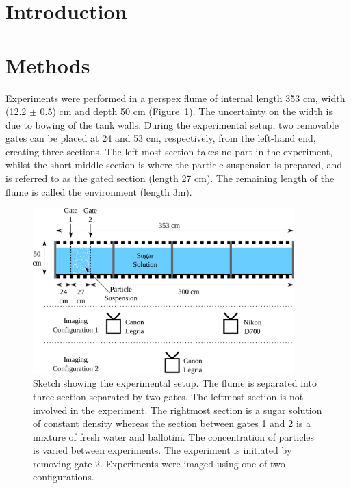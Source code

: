 \documentclass[authoryear,preprint,review,12pt]{elsarticle}
\begin{document}
\begin{frontmatter}
\begin{keyword}



\end{keyword}

\end{frontmatter}


\section{Introduction}
\label{sec:intro}

\section{Methods}
\label{sec:method}

Experiments were performed in a perspex flume of internal length 353 cm, width (12.2 $\pm$ 0.5) cm and depth 50 cm (Figure~\ref{fig:setup}). The uncertainty on the width is due to bowing of the tank walls. During the experimental setup, two removable gates can be placed at 24 and 53 cm, respectively, from the left-hand end, creating three sections. The left-most section takes no part in the experiment, whilst the short middle section is where the particle suspension is prepared, and is referred to as the gated section (length 27 cm). The remaining length of the flume is called the environment (length 3m).

\begin{figure}[ht!]
  \centerline{\includegraphics[width=0.9\textwidth]{setup.pdf}}
  \caption{Sketch showing the experimental setup. The flume is separated into three section separated by two gates. The leftmost section is not involved in the experiment. The rightmost section is a sugar solution of constant density whereas the section between gates 1 and 2 is a mixture of fresh water and ballotini. The concentration of particles is varied between experiments. The experiment is initiated by removing gate 2. Experiments were imaged using one of two configurations. }
  \label{fig:setup}
\end{figure}
\end{document}
